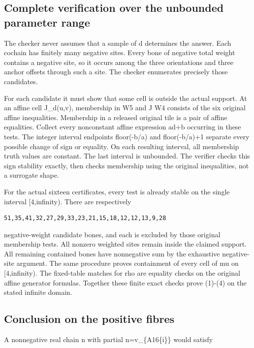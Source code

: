 \documentclass[
  10pt,
]{scrreprt}
\begin{document}
\subsection{Complete verification over the unbounded parameter
range}\label{edition-8-section-6}

The checker never assumes that a sample of d determines the answer. Each
cochain has finitely many negative sites. Every bone of negative total
weight contains a negative site, so it occurs among the three
orientations and three anchor offsets through such a site. The checker
enumerates precisely those candidates.

For each candidate it must show that some cell is outside the actual
support. At an affine cell J\_d(u,v), membership in W5 and J W4 consists
of the six original affine inequalities. Membership in a released
original tile is a pair of affine equalities. Collect every nonconstant
affine expression ad+b occurring in these tests. The integer interval
endpoints floor(-b/a) and floor(-b/a)+1 separate every possible change
of sign or equality. On each resulting interval, all membership truth
values are constant. The last interval is unbounded. The verifier checks
this sign stability exactly, then checks membership using the original
inequalities, not a surrogate shape.

For the actual sixteen certificates, every test is already stable on the
single interval {[}4,infinity). There are respectively

\begin{verbatim}
51,35,41,32,27,29,33,23,21,15,18,12,12,13,9,28
\end{verbatim}

negative-weight candidate bones, and each is excluded by those original
membership tests. All nonzero weighted sites remain inside the claimed
support. All remaining contained bones have nonnegative sum by the
exhaustive negative-site argument. The same procedure proves containment
of every cell of mu on {[}4,infinity). The fixed-table matches for rho
are equality checks on the original affine generator formulas. Together
these finite exact checks prove (1)-(4) on the stated infinite domain.

\subsection{Conclusion on the positive
fibres}\label{edition-8-section-7}

A nonnegative real chain n with partial n=v\_\{A16\{i\}\} would satisfy
\end{document}
